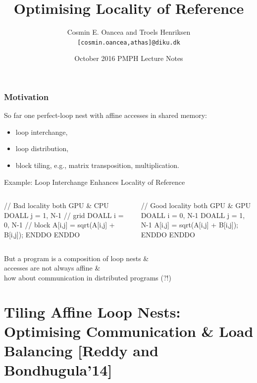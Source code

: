 \documentclass{beamer}
\title[Locality]{Optimising Locality of Reference}
\author[C.~Oancea]{Cosmin E. Oancea and Troels Henriksen\\{\tt [cosmin.oancea,athas]@diku.dk}}
\institute{Department of Computer Science (DIKU)\\University of Copenhagen}
\date[Oct 2016]{October 2016 PMPH Lecture Notes}
\newcommand{\emphh}[1]{\textcolor{CosGreen}{ #1}}
\begin{document}
\titleslide




\begin{frame}[fragile,t]
  \frametitle{Motivation}

\emphh{So far one perfect-loop nest with affine accesses in shared memory}:
\begin{itemize}
    \item loop interchange,
    \item loop distribution,
    \item block tiling, e.g., matrix transposition, multiplication.
\end  {itemize}\bigskip

\begin{block}{Example: Loop Interchange Enhances Locality of Reference}
\begin{columns}
\begin{colorcode}
// Bad locality both GPU \& CPU
\emphh{DOALL j = 1, N-1} // grid
  \emphh{DOALL i = 0, N-1} // block
    A[i,j] = sqrt(A[i,j] + B[i,j]);
  ENDDO
ENDDO
\end{colorcode}
\begin{colorcode}
// Good locality both GPU \& GPU
\emphh{DOALL i = 0, N-1}
  \emphh{DOALL j = 1, N-1}    
    A[i,j] = sqrt(A[i,j] + B[i,j]);
  ENDDO
ENDDO
\end{colorcode}
\end{columns}
\end{block} 
 
\alert{But a program is a composition of loop nests \&\\ 
accesses are not always affine \&\\
how about communication in distributed programs (?!)}

\end{frame}


\begin{frame}[fragile]
	\tableofcontents
\end{frame}

\section{Tiling Affine Loop Nests: Optimising Communication \& Load Balancing [Reddy and Bondhugula'14]}
\end{document}
